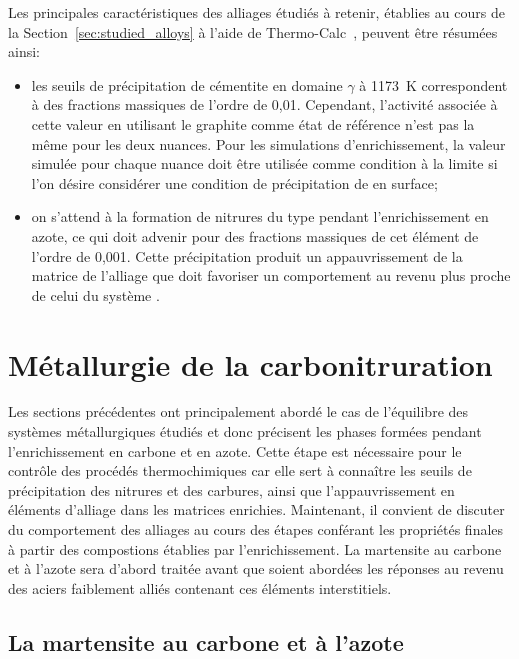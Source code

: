 Les principales caractéristiques des alliages étudiés à retenir, établies au cours de la Section~\ref{sec:studied_alloys} à l'aide de Thermo-Calc~\cite{Andersson2002,Borgenstam2000}, peuvent être résumées ainsi:
\begin{itemize}
  \item les seuils de précipitation de cémentite en domaine $\gamma$ à \SI{1173}{\kelvin} correspondent à des fractions massiques de l'ordre de 0,01. Cependant, l'activité associée à cette valeur \textendash{} en utilisant le graphite comme état de référence \textendash{} n'est pas la même pour les deux nuances. Pour les simulations d'enrichissement, la valeur simulée pour chaque nuance doit être utilisée comme condition à la limite si l'on désire considérer une condition de précipitation de  en surface;
  \item on s'attend à la formation de nitrures du type  pendant l'enrichissement en azote, ce qui doit advenir pour des fractions massiques de cet élément de l'ordre de 0,001. Cette précipitation produit un appauvrissement de la matrice de l'alliage que doit favoriser un comportement au revenu plus proche de celui du système . 
\end{itemize}

\section{Métallurgie de la carbonitruration}
\label{sec:metallurgie_cn}

Les sections précédentes ont principalement abordé le cas de l'équilibre des systèmes métallurgiques étudiés et donc précisent les phases formées pendant l'enrichissement en carbone et en azote. Cette étape est nécessaire pour le contrôle des procédés thermochimiques car elle sert à connaître les seuils de précipitation des nitrures et des carbures, ainsi que l'appauvrissement en éléments d'alliage dans les matrices enrichies. Maintenant, il convient de discuter du comportement des alliages au cours des étapes conférant les propriétés finales à partir des compostions établies par l'enrichissement. La martensite au carbone et à l'azote sera d'abord traitée avant que soient abordées les réponses au revenu des aciers faiblement alliés contenant ces éléments interstitiels.

\subsection{La martensite au carbone et à l'azote}
\label{sec:martensite_cn}

